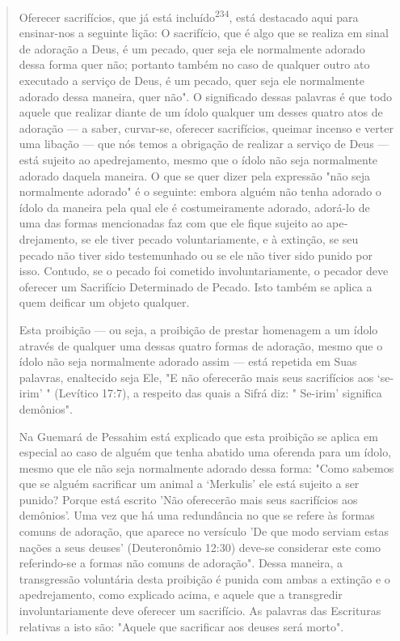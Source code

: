 \begin{quote}
Oferecer sacrifícios, que já está incluído\textsuperscript{234}, está
destacado aqui para ensinar-nos a seguinte lição: O sacrifício, que é
algo que se realiza em sinal de adoração a Deus, é um pecado, quer seja
ele normalmente adorado dessa forma quer não; portanto também no caso de
qualquer outro ato executado a serviço de Deus, é um pecado, quer seja
ele normalmente adorado dessa maneira, quer não". O significado dessas
palavras é que todo aquele que realizar diante de um ídolo qualquer um
desses quatro atos de adoração --- a saber, curvar-se, oferecer
sa­crifícios, queimar incenso e verter uma libação --- que nós temos a
obrigação de realizar a serviço de Deus --- está sujeito ao
apedrejamento, mesmo que o ídolo não seja normalmente adorado daquela
maneira. O que se quer dizer pela expressão "não seja normalmente
adorado" é o seguinte: embora alguém não tenha adorado o ídolo da
maneira pela qual ele é costumeiramente adorado, adorá-lo de uma das
formas mencionadas faz com que ele fique sujeito ao ape­drejamento, se
ele tiver pecado voluntariamente, e à extinção, se seu pecado não tiver
sido testemunhado ou se ele não tiver sido punido por isso. Contudo, se
o pecado foi cometido involuntariamente, o pecador deve oferecer um
Sa­crifício Determinado de Pecado. Isto também se aplica a quem deificar
um ob­jeto qualquer.

Esta proibição --- ou seja, a proibição de prestar homenagem a um ídolo
através de qualquer uma dessas quatro formas de adoração, mesmo que o
ídolo não seja normalmente adorado assim --- está repetida em Suas
palavras, enaltecido seja Ele, "E não oferecerão mais seus sacrifícios
aos `se-irim' " (Leví­tico 17:7), a respeito das quais a Sifrá diz: "
Se-irim' significa demônios".

Na Guemará de Pessahim está explicado que esta proibição se aplica em
especial ao caso de alguém que tenha abatido uma oferenda para um ídolo,
mesmo que ele não seja normalmente adorado dessa forma: "Como sabemos
que se alguém sacrificar um animal a `Merkulis' ele está sujeito a ser
punido? Por­que está escrito 'Não oferecerão mais seus sacrifícios aos
demônios'. Uma vez que há uma redundância no que se refere às formas
comuns de adoração, que aparece no versículo 'De que modo serviam estas
nações a seus deuses' (Deute­ronômio 12:30) deve-se considerar este como
referindo-se a formas não comuns de adoração". Dessa maneira, a
transgressão voluntária desta proibição é puni­da com ambas a extinção e
o apedrejamento, como explicado acima, e aquele que a transgredir
involuntariamente deve oferecer um sacrifício. As palavras das
Escrituras relativas a isto são: "Aquele que sacrificar aos deuses será
morto".
\end{quote}

